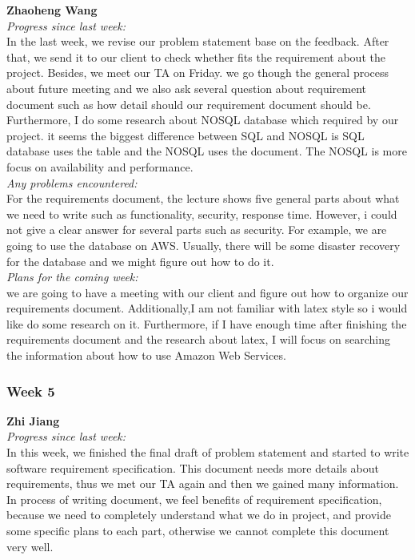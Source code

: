 \noindent\textbf{Zhaoheng Wang}\\
\noindent\textit{Progress since last week:}\\
In the last week, we revise our problem statement base on the feedback. After that, we send it to our client to check whether fits the requirement about the project. Besides, we meet our TA on Friday. we go though the general process about future meeting and we also ask several question about requirement document such as how detail should our requirement document should be. Furthermore, I do some research about NOSQL database which required by our project. it seems the biggest difference between SQL and NOSQL is SQL database uses the table and the NOSQL uses the document. The NOSQL is more focus on availability and performance.\\     

\noindent\textit{Any problems encountered:}\\
For the requirements document, the lecture shows five general parts about what we need to write such as functionality, security, response time. However, i could not give a clear answer for several parts such as security. For example, we are going to use the database on AWS. Usually, there will be some disaster recovery for the database and we might figure out how to do it.\\   

\noindent\textit{Plans for the coming week:}\\
we are going to have a meeting with our client and figure out how to organize our requirements document. Additionally,I am not familiar with latex style so i would like do some research on it. Furthermore, if I have enough time after finishing the requirements document and the research about latex, I will focus on searching the information about how to use Amazon Web Services.

\subsubsection{Week 5}

\textbf{Zhi Jiang}\\
\noindent\textit{Progress since last week:}\\
In this week, we finished the final draft of problem statement and started to write software requirement specification. This document needs more details about requirements, thus we met our TA again and then we gained many information. In process of writing document, we feel benefits of requirement specification, because we need to completely understand what we do in project, and provide some specific plans to each part, otherwise we cannot complete this document very well.\\ 

